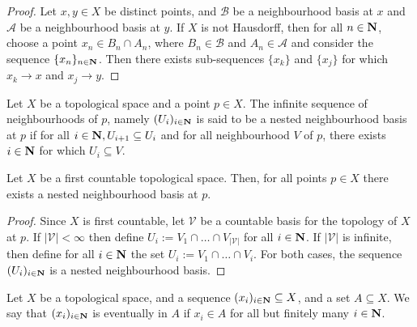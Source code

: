 \begin{proof}
  Let \(x, y \in X\) be distinct points, and \(\mathcal B\) be a neighbourhood
  basis at \(x\) and \(\mathcal A\) be a neighbourhood basis at \(y\). If \(X\)
  is not Hausdorff, then for all \(n \in \mathbf{N}\), choose a point \(x_n \in
  B_n \cap A_n\), where \(B_n \in \mathcal B\) and \(A_n \in \mathcal A\) and
  consider the sequence \(\{x_n\}_{n \in \mathbf{N}}\). Then there exists
  sub-sequences \(\{x_k\}\) and \(\{x_j\}\) for which \(x_k \to x\) and \(x_j \to
  y\).
\end{proof}

\begin{definition}
  Let \(X\) be a topological space and a point \(p \in X\). The infinite sequence
  of neighbourhoods of \(p\), namely \((U_i)_{i \in \mathbf{N}}\) is said to be
  a nested neighbourhood basis at \(p\) if for all \(i \in \mathbf{N}, U_{i+1}
  \subseteq U_i\) and for all neighbourhood \(V\) of \(p\), there exists \(i \in
  \mathbf{N}\) for which \(U_i \subseteq V\).
\end{definition}

\begin{lemma}
  Let \(X\) be a first countable topological space. Then, for all points \(p \in
  X\) there exists a nested neighbourhood basis at \(p\).
\end{lemma}

\begin{proof}
  Since \(X\) is first countable, let \(\mathcal V\) be a countable basis for the
  topology of \(X\) at \(p\). If \(|\mathcal V| < \infty\) then define \(U_i :=
  V_1 \cap \dots \cap V_{|\mathcal V|}\) for all \(i \in \mathbf{N}\). If
  \(|\mathcal V|\) is infinite, then define for all \(i \in \mathbf{N}\) the
  set \(U_i := V_1 \cap \dots \cap V_i\). For both cases, the sequence
  \((U_i)_{i \in \mathbf{N}}\) is a nested neighbourhood basis.
\end{proof}

\begin{definition}[Eventually in]
  Let \(X\) be a topological space, and a sequence \((x_i)_{i \in \mathbf{N}}
  \subseteq X\), and a set \(A \subseteq X\). We say that \((x_i)_{i \in
  \mathbf{N}}\) is eventually in \(A\) if \(x_i \in A\) for all but finitely
  many \(i \in \mathbf{N}\).
\end{definition}

